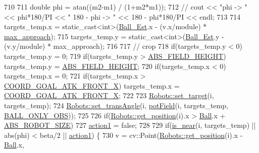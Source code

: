 \begin{DoxyCode}
710 
711     \textcolor{keywordtype}{double} phi = atan((m2-m1) / (1+m2*m1));
712     \textcolor{comment}{// cout << "phi -> " << phi*180/PI << " 180 - phi -> " << 180 - phi*180/PI << endl;}
713 
714     targets\_temp.x = \textcolor{keyword}{static\_cast<}\textcolor{keywordtype}{int}\textcolor{keyword}{>}(\hyperlink{class_strategy_ae629b11b862d24dba3fb3322659e439e}{Ball\_Est}.x - (v.x/module) * 
      \hyperlink{namespace_c_o_n_s_t_ae2d0cdffa1b71008198e4f7455a5d17e}{max\_approach});
715     targets\_temp.y = \textcolor{keyword}{static\_cast<}\textcolor{keywordtype}{int}\textcolor{keyword}{>}(\hyperlink{class_strategy_ae629b11b862d24dba3fb3322659e439e}{Ball\_Est}.y - (v.y/module) * max\_approach);
716 
717     \textcolor{comment}{// crop}
718     \textcolor{keywordflow}{if}(targets\_temp.y < 0) targets\_temp.y = 0;
719     \textcolor{keywordflow}{if}(targets\_temp.y > \hyperlink{namespace_c_o_n_s_t_a42a76a781b7cd424616b37ec9d720f98}{ABS\_FIELD\_HEIGHT}) targets\_temp.y = 
      \hyperlink{namespace_c_o_n_s_t_a42a76a781b7cd424616b37ec9d720f98}{ABS\_FIELD\_HEIGHT};
720     \textcolor{keywordflow}{if}(targets\_temp.x < 0) targets\_temp.x = 0;
721     \textcolor{keywordflow}{if}(targets\_temp.x > \hyperlink{namespace_c_o_n_s_t_a8788c5d888fd3e9d9382502aee24afee}{COORD\_GOAL\_ATK\_FRONT\_X}) targets\_temp.x = 
      \hyperlink{namespace_c_o_n_s_t_a8788c5d888fd3e9d9382502aee24afee}{COORD\_GOAL\_ATK\_FRONT\_X};
722 
723     \hyperlink{class_robots_ac1cd5c41b6e5d5643b2186ca51699c8f}{Robots::set\_target}(i, targets\_temp);
724     \hyperlink{class_robots_ac18c807efc15557ce996563bb76451ea}{Robots::set\_transAngle}(i, \hyperlink{class_strategy_ac26f11116f795185176383122f9f088c}{potField}(i, targets\_temp, 
      \hyperlink{strategy_8hpp_a8a115d5877f5ae5a0cb0e0dbd2fcb9ec}{BALL\_ONLY\_OBS}));
725 
726     \textcolor{keywordflow}{if}(\hyperlink{class_robots_a1fca8f2f5070176faa6ba1efa2f1ff14}{Robots::get\_position}(i).x > \hyperlink{class_strategy_abd16b6276e747f6cd99a19963ff5495b}{Ball}.x + 
      \hyperlink{namespace_c_o_n_s_t_a8d0d7fe4341b9129cabd565ef16a0640}{ABS\_ROBOT\_SIZE})
727         \hyperlink{class_strategy_a4de1cb2a30b7eb871e68ddefd03f6089}{action1} = \textcolor{keyword}{false};
728 
729     \textcolor{keywordflow}{if}(\hyperlink{class_strategy_a39e538cde3f236f918ad8b7501c92987}{is\_near}(i, targets\_temp) || abs(phi) < beta/2 || \hyperlink{class_strategy_a4de1cb2a30b7eb871e68ddefd03f6089}{action1}) \{
730         v = cv::Point(\hyperlink{class_robots_a1fca8f2f5070176faa6ba1efa2f1ff14}{Robots::get\_position}(i).x - \hyperlink{class_strategy_abd16b6276e747f6cd99a19963ff5495b}{Ball}.x, 

\end{DoxyCode}
